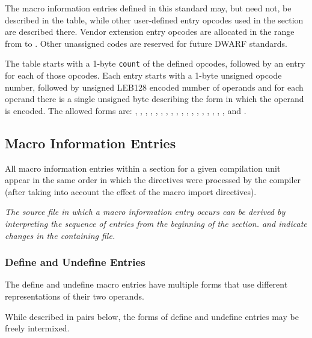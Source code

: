 \begin{enumerate}[1. ]
The macro information entries defined in this standard may, but need not, be
described in the table, while other user-defined entry opcodes used in the section
are described there.  Vendor extension entry opcodes are
allocated in the range from \DWMACROlouser{} to \DWMACROhiuser. Other
unassigned codes are reserved for future DWARF standards.

The table starts with a 1-byte \texttt{count} of the defined opcodes, followed by
an entry for each of those opcodes.  Each entry starts with a 1-byte unsigned
opcode number, followed by unsigned LEB128 encoded number of operands
and for each operand there is a single unsigned byte describing the form in which
the operand is encoded.  The allowed forms are: 
\DWFORMblock, \DWFORMblockone, \DWFORMblocktwo, \DWFORMblockfour,
\DWFORMdataone, \DWFORMdatatwo, \DWFORMdatafour, \DWFORMdataeight, 
\DWFORMdatasixteen,  
\DWFORMflag, \DWFORMlinestrp, \DWFORMsdata, 
\DWFORMsecoffset, \DWFORMstring, \DWFORMstrp{},
\bb
\DWFORMstrpeight,
\eb 
\DWFORMstrpsup,
\bb
\DWFORMstrpsupeight,
\eb
\DWFORMstrxXN{} and \DWFORMudata.
\end{enumerate}

\subsection{Macro Information Entries}
\label{chap:macroinformationentries}
All macro information entries within a \dotdebugmacro{}
section for a given compilation unit appear in the same 
order in which the directives were processed by the 
compiler (after taking into account the effect of the
macro import directives).

\textit{The source file in which a macro information entry occurs
can be derived by interpreting the sequence of entries from the
beginning of the \dotdebugmacro{} section. \DWMACROstartfile{} and 
\DWMACROendfile{} indicate changes in the containing file.} 

\subsubsection{Define and Undefine Entries}
\label{chap:defineandundefineentries}
The define and undefine macro entries have multiple forms that
use different representations of their two operands.

While described in pairs below, the forms of define 
and undefine entries may be freely intermixed.

